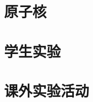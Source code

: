 
\vspace{1em}


\section{原子核}


\vspace{1em}


\vspace{1em}


\vspace{1em}


\section{学生实验}


\vspace{1em}


\vspace{1em}


\section{课外实验活动}


\vspace{1em}



